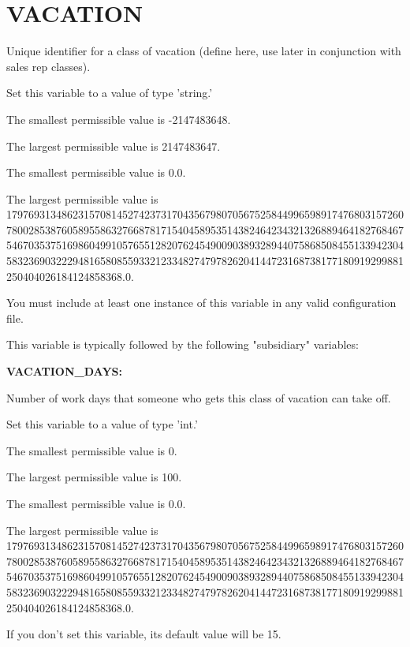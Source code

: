 \def\MyPath{/ home/ idan/ confedit/ src/ schema.tex}
\def\MyTitle{Configuration file syntax}
\def\MyDate{2024-04-20}






\section{VACATION}


Unique identifier for a class of vacation (define here, use later in conjunction with sales rep classes).

Set this variable to a value of type 'string.'

The smallest permissible value is -2147483648.

The largest permissible value is 2147483647.

The smallest permissible value is 0.0.

The largest permissible value is 179769313486231570814527423731704356798070567525844996598917476803157260780028538760589558632766878171540458953514382464234321326889464182768467546703537516986049910576551282076245490090389328944075868508455133942304583236903222948165808559332123348274797826204144723168738177180919299881250404026184124858368.0.

You must include at least one instance of this variable in any valid configuration file.

This variable is typically followed by the following "subsidiary" variables:


\textbf{VACATION\_DAYS:}


Number of work days that someone who gets this class of vacation can take off.

Set this variable to a value of type 'int.'

The smallest permissible value is 0.

The largest permissible value is 100.

The smallest permissible value is 0.0.

The largest permissible value is 179769313486231570814527423731704356798070567525844996598917476803157260780028538760589558632766878171540458953514382464234321326889464182768467546703537516986049910576551282076245490090389328944075868508455133942304583236903222948165808559332123348274797826204144723168738177180919299881250404026184124858368.0.

If you don't set this variable, its default value will be 15.


